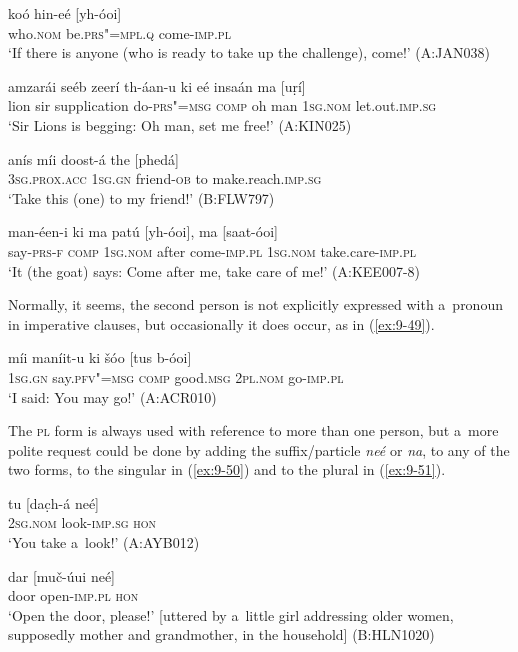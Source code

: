 \begin{exe}
\ex
\label{ex:9-45}
\gll koó hin-eé [yh-óoi]  \\
who.\textsc{nom} be.\textsc{prs"=mpl.q} come-\textsc{imp.pl}  \\
\glt `If there is anyone (who is ready to take up the challenge), come!' (A:JAN038)

\ex
\label{ex:9-46}
\gll amzarái seéb zeerí th-áan-u ki eé insaán ma [uṛí] \\
lion sir supplication do-\textsc{prs"=msg} \textsc{comp} oh  man \textsc{1sg.nom} let.out.\textsc{imp.sg} \\
\glt `Sir Lions is begging: Oh man, set me free!' (A:KIN025)

\ex
\label{ex:9-47}
\gll anís míi doost-á the [phedá] \\
\textsc{3sg.prox.acc} \textsc{1sg.gn} friend-\textsc{ob} to make.reach.\textsc{imp.sg} \\
\glt `Take this (one) to my friend!' (B:FLW797)

\ex
\label{ex:9-48}
\gll man-éen-i ki ma patú [yh-óoi], ma [saat-óoi] \\
say-\textsc{prs-f} \textsc{comp} \textsc{1sg.nom} after come-\textsc{imp.pl} \textsc{1sg.nom} take.care-\textsc{imp.pl} \\
\glt `It (the goat) says: Come after me, take care of me!' (A:KEE007-8)
\end{exe}

Normally, it seems, the second person is not explicitly expressed with a~pronoun in imperative clauses, but occasionally it does occur, as in (\ref{ex:9-49}).

\begin{exe}
\ex
\label{ex:9-49}
\gll míi maníit-u ki šóo [tus b-óoi] \\
\textsc{1sg.gn} say.\textsc{pfv"=msg} \textsc{comp} good.\textsc{msg} \textsc{2pl.nom} go-\textsc{imp.pl} \\
\glt `I said: You may go!' (A:ACR010)
\end{exe}

The \textsc{pl} form is always used with reference to more than one person, but a~more polite request could be done by adding the suffix/particle \textit{neé} or \textit{na}, to any of the two forms, to the singular in (\ref{ex:9-50}) and to the plural in (\ref{ex:9-51}).

\begin{exe}
\ex
\label{ex:9-50}
\gll tu [dac̣h-á neé] \\
\textsc{2sg.nom} look-\textsc{imp.sg} \textsc{hon}  \\
\glt `You take a~look!' (A:AYB012)

\ex
\label{ex:9-51}
\gll dar [muč-úui neé] \\
door open-\textsc{imp.pl} \textsc{hon} \\
\glt `Open the door, please!' [uttered by a~little girl addressing older women, supposedly mother and grandmother, in the household] (B:HLN1020)
\end{exe}

